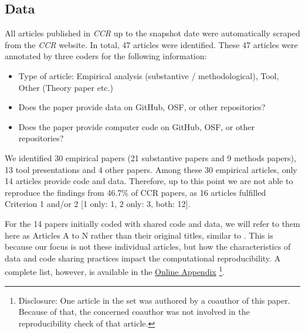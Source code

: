 \subsection{Data}%


All articles published in \textit{CCR} up to the snapshot date were automatically scraped from the \textit{CCR} website. In total, 47 articles were identified.
These 47 articles were annotated by three coders for the following information:

\begin{itemize}
  \item Type of article: Empirical analysis (substantive / methodological), Tool, Other (Theory paper etc.)
  \item Does the paper provide data on GitHub, OSF, or other repositories?
  \item Does the paper provide computer code on GitHub, OSF, or other repositories?
\end{itemize}

We identified 30 empirical papers (21 substantive papers and 9 methods papers), 13 tool presentations and 4 other papers. Among these 30 empirical articles, only 14 articles provide code and data. Therefore, up to this point we are not able to reproduce the findings from 46.7\% of CCR papers, as 16 articles fulfilled Criterion 1 and/or 2 [1 only: 1, 2 only: 3, both: 12].

For the 14 papers initially coded with shared code and data, we will refer to them here as Articles A to N rather than their original titles, similar to \textcite[]{cruewell:2023:WB}. This is because our focus is not these individual articles, but how the characteristics of data and code sharing practices impact the computational reproducibility. A complete list, however, is available in the \href{https://github.com/Kudusch/reprohack23}{Online Appendix} %
\footnote{Disclosure: One article in the set %
was authored by a coauthor of this paper. Because of that, the concerned coauthor was not involved in the reproducibility check of that article.}.


